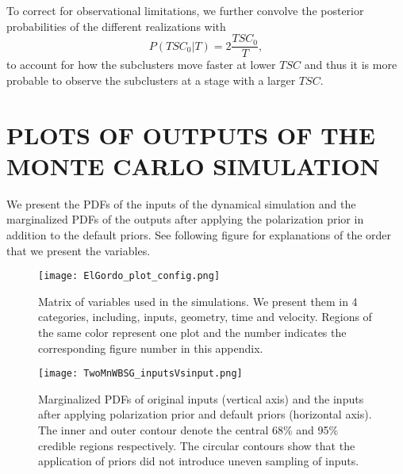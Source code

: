 To correct for observational limitations, we further convolve the
posterior probabilities of the different realizations with 
\begin{equation}
	P(TSC_0 | T) = 2 \frac{TSC_0}{T},
\end{equation}
to account for how the subclusters move faster at lower $TSC$ and thus it
is more probable to observe the subclusters at a stage with a larger $TSC$.

\par 

%

%

\section{PLOTS OF OUTPUTS OF THE MONTE CARLO SIMULATION}
We present the PDFs of the inputs of the dynamical simulation and the
marginalized PDFs of the outputs after applying the polarization prior in
addition to the default priors. See following figure for explanations of
the order that we present the variables. 
\begin{figure}
	\begin{center}
	\texttt{[image: ElGordo\_plot\_config.png]}
	\end{center}
	\caption{Matrix of variables used in the simulations. We present them in
	4 categories, including, inputs, geometry, time and velocity. Regions of
	the same color represent one plot and the number
indicates the corresponding figure number in this appendix.}
\end{figure}



\label{app:results}


\clearpage
\begin{figure*}
	\begin{minipage}{180mm}
	\begin{center}
	\texttt{[image: TwoMnWBSG\_inputsVsinput.png]}
	\caption{Marginalized PDFs of original inputs (vertical axis) and the inputs after
applying polarization prior and default priors (horizontal axis). The inner and outer contour
denote the central 68\% and 95\% credible regions respectively.
The circular contours show that the application of priors did not introduce
uneven sampling of inputs. }
	\end{center}
	\end{minipage}
\end{figure*}

